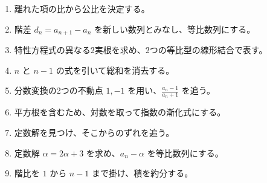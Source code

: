 \begin{enumerate}[label=\textbf{問\arabic*.},leftmargin=3.8em,format=\bookitemlink{practice-basic}{hint}{problem}]
        \item 離れた項の比から公比を決定する。
        \item 階差 \(d_n=a_{n+1}-a_n\) を新しい数列とみなし、等比数列にする。
        \item 特性方程式の異なる2実根を求め、2つの等比型の線形結合で表す。
        \item \(n\) と \(n-1\) の式を引いて総和を消去する。
        \item 分数変換の2つの不動点 \(1,-1\) を用い、\(\frac{a_n-1}{a_n+1}\) を追う。
        \item 平方根を含むため、対数を取って指数の漸化式にする。
        \item 定数解を見つけ、そこからのずれを追う。
        \item 定数解 \(\alpha=2\alpha+3\) を求め、\(a_n-\alpha\) を等比数列にする。
        \item 階比を \(1\) から \(n-1\) まで掛け、積を約分する。
      \end{enumerate}

